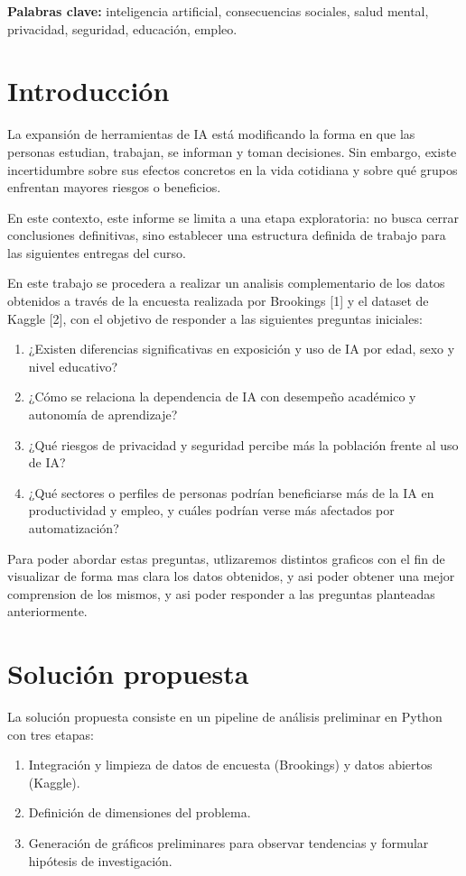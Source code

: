 \documentclass[12pt,a4paper]{article}
\begin{document}
\textbf{Palabras clave:} inteligencia artificial, consecuencias sociales, salud mental, privacidad, seguridad, educación, empleo.

\section{Introducción}
La expansión de herramientas de IA está modificando la forma en que las personas estudian, trabajan, se informan y toman decisiones. Sin embargo, existe incertidumbre sobre sus efectos concretos en la vida cotidiana y sobre qué grupos enfrentan mayores riesgos o beneficios.


En este contexto, este informe se limita a una etapa exploratoria: no busca cerrar conclusiones definitivas, sino establecer una estructura definida de trabajo para las siguientes entregas del curso.

En este trabajo se procedera a realizar un analisis complementario de los datos obtenidos a través de la encuesta realizada por Brookings [1] y el dataset de Kaggle [2], con el objetivo de responder a las siguientes preguntas iniciales:
\begin{enumerate}
    \item ¿Existen diferencias significativas en exposición y uso de IA por edad, sexo y nivel educativo?
    \item ¿Cómo se relaciona la dependencia de IA con desempeño académico y autonomía de aprendizaje?
    \item ¿Qué riesgos de privacidad y seguridad percibe más la población frente al uso de IA?
    \item ¿Qué sectores o perfiles de personas podrían beneficiarse más de la IA en productividad y empleo, y cuáles podrían verse más afectados por automatización?
\end{enumerate}

Para poder abordar estas preguntas, utlizaremos distintos graficos con el fin de visualizar de forma mas clara los datos obtenidos, y asi poder obtener una mejor comprension de los mismos, y asi poder responder a las preguntas planteadas anteriormente.

\section{Solución propuesta}
La solución propuesta consiste en un pipeline de análisis preliminar en Python con tres etapas:



\begin{enumerate}
    \item Integración y limpieza de datos de encuesta (Brookings) y datos abiertos (Kaggle).
    \item Definición de dimensiones del problema. 
    \item Generación de gráficos preliminares para observar tendencias y formular hipótesis de investigación.
\end{enumerate}
\end{document}
